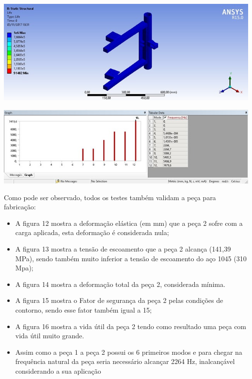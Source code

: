     \begin{center}
    	\includegraphics[scale=0.7]{figuras/vida_util_4}
        \label{vida_util_4}
    \end{center}

    \begin{center}
    	\includegraphics[scale=0.7]{figuras/vibracao_2}
        \label{vibracao_2}
    \end{center}    

    Como pode ser observado, todos os testes também validam a peça para fabricação:
 
    \begin{itemize}
        \item A figura 12 mostra a deformação elástica (em mm) que a peça 2 sofre com a carga aplicada, esta deformação é considerada nula;
        \item A figura 13 mostra a tensão de escoamento que a peça 2 alcança (141,39 MPa), sendo também muito inferior a tensão de escoamento do aço 1045 (310 Mpa);
        \item A figura 14 mostra a deformação total da peça 2, considerada mínima.
        \item A figura 15 mostra o Fator de segurança da peça 2 pelas condições de contorno, sendo esse fator também igual a 15;
        \item A figura 16 mostra a vida útil da peça 2 tendo como resultado uma peça com vida útil muito grande.
        \item Assim como a peça 1 a peça 2 possui os 6 primeiros modos e para chegar na frequência natural da peça seria necessário alcançar 2264 Hz, inalcançável considerando a sua aplicação
    \end{itemize}

